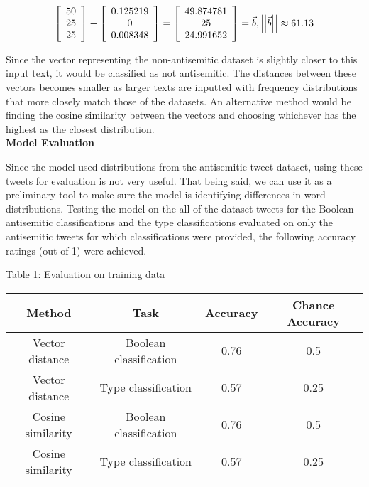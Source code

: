 \documentclass{article}
\begin{document}
\[
\left[ {\begin{array}{c}
    50\\
    25\\
    25\\
  \end{array} } \right] - \left[ {\begin{array}{c}
    0.125219\\
    0\\
    0.008348\\
  \end{array} } \right] = \left[ {\begin{array}{c}
    49.874781\\
    25\\
    24.991652\\
  \end{array} } \right] = \vec{b},\hfill \left| \left| \vec{b} \right| \right| \approx 61.13
\]

Since the vector representing the non-antisemitic dataset is slightly closer to this input text, it would be classified as not antisemitic. The distances between these vectors becomes smaller as larger texts are inputted with frequency distributions that more closely match those of the datasets. An alternative method would be finding the cosine similarity between the vectors and choosing whichever has the highest as the closest distribution.\\

{\bf Model Evaluation}

Since the model used distributions from the antisemitic tweet dataset, using these tweets for evaluation is not very useful. That being said, we can use it as a preliminary tool to make sure the model is identifying differences in word distributions. Testing the model on the all of the dataset tweets for the Boolean antisemitic classifications and the type classifications evaluated on only the antisemitic tweets for which classifications were provided, the following accuracy ratings (out of 1) were achieved.
\begin{center}
Table 1: Evaluation on training data\\
\begin{tabular}{ |c|c|c|c| } 
 \hline
{\bf Method} & \bf{Task} & \bf{Accuracy} & \bf{Chance Accuracy}\\
\hline Vector distance & Boolean classification & 0.76 & 0.5\\ 
\hline Vector distance & Type classification & 0.57 & 0.25\\ 
\hline Cosine similarity & Boolean classification & 0.76 & 0.5\\ 
\hline Cosine similarity & Type classification & 0.57 & 0.25\\ 
 \hline
\end{tabular}
\end{center}
\end{document}
